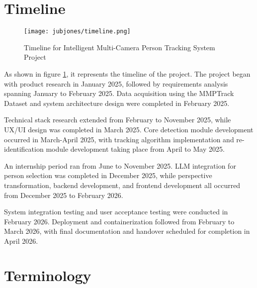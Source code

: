 \section{Timeline}
\label{section:timeline}

\begin{figure}[!htb]
    \centering
    \texttt{[image: jubjones/timeline.png]}
    \caption{Timeline for Intelligent Multi-Camera Person Tracking System Project}
    \label{fig:timeline}
\end{figure}
\clearpage
As shown in figure \ref{fig:timeline}, it represents the timeline of the project.
The project began with product research in January 2025, followed by requirements analysis spanning January to February 2025. Data acquisition using the MMPTrack Dataset and system architecture design were completed in February 2025.

Technical stack research extended from February to November 2025, while UX/UI design was completed in March 2025. Core detection module development occurred in March-April 2025, with tracking algorithm implementation and re-identification module development taking place from April to May 2025.

An internship period ran from June to November 2025. LLM integration for person selection was completed in December 2025, while perspective transformation, backend development, and frontend development all occurred from December 2025 to February 2026.

System integration testing and user acceptance testing were conducted in February 2026. Deployment and containerization followed from February to March 2026, with final documentation and handover scheduled for completion in April 2026.


\section{Terminology}
\label{section:terminology}

